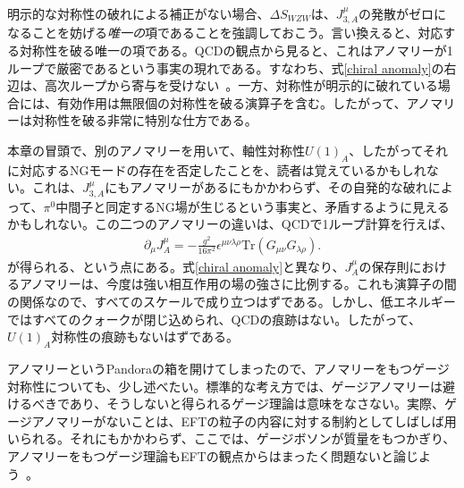 明示的な対称性の破れによる補正がない場合、$\Delta S_{WZW}$は、$J^\mu_{3, A}$の発散がゼロになることを妨げる\emph{唯一の}項であることを強調しておこう。言い換えると、対応する対称性を破る唯一の項である。QCDの観点から見ると、これはアノマリーが1ループで厳密であるという事実の現れである。すなわち、式\eqref{chiral anomaly}の右辺は、高次ループから寄与を受けない~\cite{Harvey:2005it}。一方、対称性が明示的に破れている場合には、有効作用は無限個の対称性を破る演算子を含む。したがって、アノマリーは対称性を破る非常に特別な仕方である。

本章の冒頭で、別のアノマリーを用いて、軸性対称性$U(1)_A$、したがってそれに対応するNGモードの存在を否定したことを、読者は覚えているかもしれない。これは、$J^\mu_{3, A}$にもアノマリーがあるにもかかわらず、その自発的な破れによって、$\pi^0$中間子と同定するNG場が生じるという事実と、矛盾するように見えるかもしれない。この二つのアノマリーの違いは、QCDで1ループ計算を行えば、
%
\begin{align}
	\partial_\mu J^\mu_A = - \frac{g^2}{16 \pi^2} \epsilon^{\mu\nu\lambda\rho} \mbox{Tr} (G_{\mu\nu} G_{\lambda \rho} ) .
\end{align}
% 
が得られる、という点にある。式\eqref{chiral anomaly}と異なり、$J^\mu_A$の保存則におけるアノマリーは、今度は強い相互作用の場の強さに比例する。これも演算子の間の関係なので、すべてのスケールで成り立つはずである。しかし、低エネルギーではすべてのクォークが閉じ込められ、QCDの痕跡はない。したがって、$U(1)_A$対称性の痕跡もないはずである。




アノマリーというPandoraの箱を開けてしまったので、アノマリーをもつゲージ対称性についても、少し述べたい。標準的な考え方では、ゲージアノマリーは避けるべきであり、そうしないと得られるゲージ理論は意味をなさない。実際、ゲージアノマリーがないことは、EFTの粒子の内容に対する制約としてしばしば用いられる。それにもかかわらず、ここでは、ゲージボソンが質量をもつかぎり、アノマリーをもつゲージ理論もEFTの観点からはまったく問題ないと論じよう~\cite{Preskill:1990fr}。

